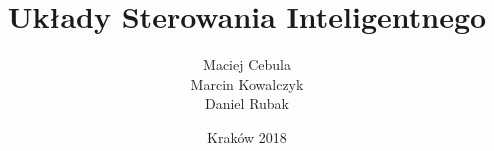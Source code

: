 \documentclass[12pt]{report}
\title{\textbf{Układy Sterowania Inteligentnego}}
\author{Maciej Cebula \\Marcin Kowalczyk \\ Daniel Rubak}
\date{Kraków 2018}
\begin{document}
	

	\setcounter{tocdepth}{2}
	
	\maketitle
	\tableofcontents
	\clearpage
		
		\renewcommand{\tablename}{Tabela}
		\renewcommand{\figurename}{Rys.}
		
	
	
	
	
	
	
	
	
	
	
\end{document}
